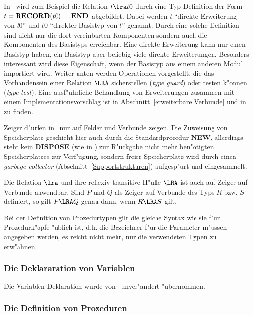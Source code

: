In \oberon\ wird zum Beispiel die Relation $t \lra t0$ durch eine Typ-Definition
der Form $t =\hbox{\bf RECORD} (t0) \ldots \hbox{\bf END}$ abgebildet.
Dabei werden $t$ "`direkte Erweiterung von $t0$"' und $t0$ "`direkter Basistyp von
$t$"' genannt.
Durch eine solche Definition sind nicht nur die dort vereinbarten Komponenten
sondern auch die Komponenten des Basistyps erreichbar.
Eine direkte Erweiterung kann nur einen Basistyp haben, ein Basistyp aber beliebig viele
direkte Erweiterungen.
Besonders interessant wird diese Eigenschaft, wenn der Basistyp aus einem anderen
Modul importiert wird.
Weiter unten werden Operationen vorgestellt, die das Vorhandensein einer
Relation $\LRA$ sicherstellen ({\it type guard}) oder testen k"onnen ({\it type test}).
Eine ausf"uhrliche Behandlung von Erweiterungen zusammen mit einem
Implementationsvorschlag ist in Abschnitt~\ref{erweiterbare Verbunde} und in
\cite{typeExtensions} zu finden.

\medskip
Zeiger d"urfen in \oberon\ nur auf Felder und Verbunde zeigen.
Die Zuweisung von Speicherplatz geschieht hier auch durch die
Standardprozedur {\bf NEW}, allerdings steht kein {\bf DISPOSE} (wie in \modula)
zur R"uckgabe nicht mehr ben"otigten Speicherplatzes zur Verf"ugung, sondern
freier Speicherplatz wird durch einen {\it garbage collector\/}
(Abschnitt~\ref{Supportstrukturen}) aufgesp"urt und eingesammelt.

Die Relation $\lra$ und ihre reflexiv-transitive H"ulle $\LRA$ ist auch auf
Zeiger auf Verbunde anwendbar.
Sind $P$ und $Q$ als Zeiger auf Verbunde des Typs $R$ bzw. $S$ definiert,
so gilt $P\LRA Q$ genau dann, wenn $R\LRA S$ gilt.

\medskip
Bei der Definition von Prozedurtypen gilt die gleiche Syntax wie sie f"ur
Prozedurk"opfe "ublich ist, d.h. die Bezeichner f"ur die Parameter m"ussen
angegeben werden, es reicht nicht mehr, nur die verwendeten Typen zu
erw"ahnen.

\subsubsection{Die Deklararation von Variablen}

Die Variablen-Deklaration wurde von \modula\ unver"andert "ubernommen.

\subsubsection{Die Definition von Prozeduren}
\label{Definition von Prozeduren}

